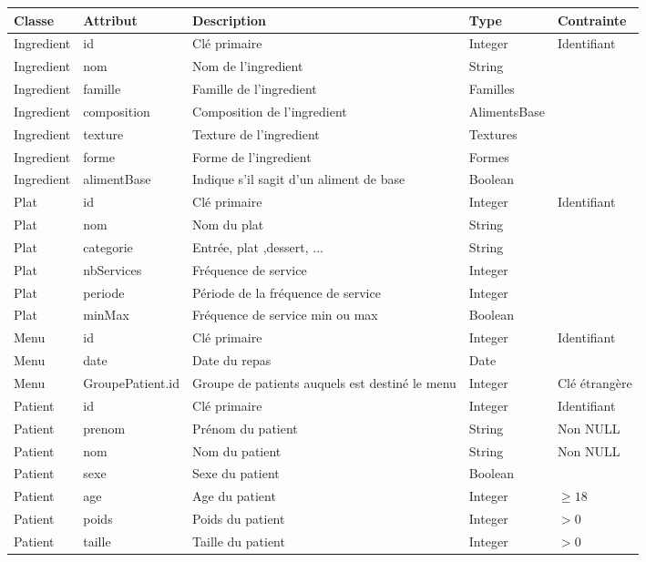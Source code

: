 \begin{table}
\begin{tabular}{llp{5cm}ll}
  \hline
  \textbf{Classe} & \textbf{Attribut} & \textbf{Description} & \textbf{Type} & \textbf{Contrainte} \\ \hline
  Ingredient & id & Clé primaire & Integer & Identifiant \\
  Ingredient & nom & Nom de l'ingredient & String & \\
  Ingredient & famille & Famille de l'ingredient & Familles & \\
  Ingredient & composition & Composition de l'ingredient & AlimentsBase & \\
  Ingredient & texture & Texture de l'ingredient & Textures & \\
  Ingredient & forme & Forme de l'ingredient & Formes & \\
  Ingredient & alimentBase & Indique s'il sagit d'un aliment de base & Boolean & \\ \hline
  Plat & id & Clé primaire & Integer & Identifiant \\
  Plat & nom & Nom du plat & String & \\
  Plat & categorie & Entrée, plat ,dessert, ... & String & \\
  Plat & nbServices & Fréquence de service & Integer & \\
  Plat & periode & Période de la fréquence de service & Integer & \\
  Plat & minMax & Fréquence de service min ou max & Boolean & \\ \hline
  Menu & id & Clé primaire & Integer & Identifiant \\
  Menu & date & Date du repas & Date & \\
  Menu & GroupePatient.id &  Groupe de patients auquels est destiné le menu & Integer & Clé étrangère \\ \hline
  Patient & id & Clé primaire & Integer & Identifiant \\
  Patient & prenom & Prénom du patient & String & Non NULL\\
  Patient & nom & Nom du patient & String & Non NULL\\
  Patient & sexe & Sexe du patient & Boolean & \\
  Patient & age & Age du patient & Integer & $\geqslant 18$\\ %
  Patient & poids & Poids du patient & Integer & $> 0$ \\
  Patient & taille & Taille du patient & Integer & $> 0$ \\

\end{tabular}
\end{table}
